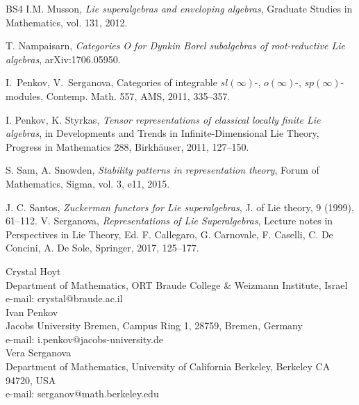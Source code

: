 \documentclass[12pt,oneside,english]{amsart}
\numberwithin{equation}{section}
\numberwithin{figure}{section}
\theoremstyle{plain}
\theoremstyle{plain}
\theoremstyle{remark}
\theoremstyle{definition}
\theoremstyle{plain}
\theoremstyle{remark}
\theoremstyle{definition}
\theoremstyle{plain}
\theoremstyle{plain}
\theoremstyle{definition}
\begin{document}
\begin{thebibliography}{BS4}
 I.M. Musson,  {\it Lie superalgebras and enveloping algebras}, Graduate Studies in Mathematics, vol. 131, 2012.

 T. Nampaisarn, {\it Categories O for Dynkin Borel subalgebras of root-reductive Lie algebras}, arXiv:1706.05950.

 I.~Penkov, V.~Serganova, Categories of integrable $sl(\infty)$-, $o(\infty)$-, $sp(\infty)$-modules, Contemp.
Math. {557}, AMS, 2011, 335--357.

 I. Penkov, K. Styrkas, {\it  Tensor representations of classical locally finite Lie algebras}, in Developments and Trends in Infinite-Dimensional Lie Theory, Progress in Mathematics 288, Birkh\"auser, 2011, 127--150.

  S. Sam, A. Snowden, {\it Stability patterns in representation theory}, Forum of Mathematics, Sigma, vol. 3, e11, 2015.

 J. C. Santos, {\it Zuckerman functors for Lie superalgebras}, J. of Lie theory, 9 (1999), 61--112.
 V. Serganova, {\it Representations of Lie Superalgebras}, Lecture notes in
Perspectives in Lie Theory, Ed.
F. Callegaro, G. Carnovale, F. Caselli, C. De Concini, A. De Sole, Springer,  2017, 125--177.
\end{thebibliography}
%


\noindent Crystal Hoyt\\
Department of Mathematics, ORT Braude College \& Weizmann Institute, Israel\\
e-mail: crystal@braude.ac.il\\

\noindent Ivan Penkov\\
Jacobs University Bremen, Campus Ring 1, 28759, Bremen, Germany\\
e-mail: i.penkov@jacobs-university.de\\

\noindent Vera Serganova\\
Department of Mathematics, University of California Berkeley, Berkeley CA 94720, USA\\
e-mail: serganov@math.berkeley.edu\\
\end{document}
